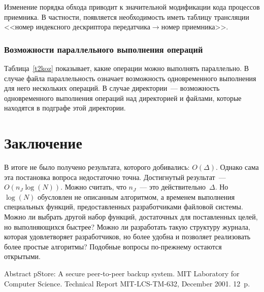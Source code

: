 \begin{multicols}{2}
      Изменение порядка обхода приводит к значительной модификации кода 
процессов приемника. В частности, появляется необходимость иметь таб\-ли\-цу 
трансляции <<номер индексного дескриптора передатчика\;$\rightarrow$\;номер 
приемника>>.

\vspace*{-6pt}

\subsubsection{Возможности параллельного выполнения операций} %

      Таблица~\ref{t2koz} показывает, какие операции можно выполнять 
параллельно. В случае файла параллельность означает возможность 
одновременного выполнения для него нескольких операций. В случае 
директории~--- возможность одновременного выполнения операций над 
директорией и файлами, которые находятся в подграфе этой директории. 
      

\vspace*{-6pt}
\section{Заключение}
\vspace*{1pt}

В итоге не было получено результата, которого добивались: $O(\Delta )$. 
Однако сама эта постановка вопроса недостаточно точна.   Достигнутый 
результат~--- $O(n_J \log(N))$.  Можно считать, что $n_J$~--- это действительно~$\Delta$. 
Но $\log (N)$ обусловлен не описанным алгоритмом, а временем выполнения 
специальных функций, предоставленных разработчиками файловой системы. 
Можно ли выбрать другой набор функций,  достаточных для поставленных 
целей, но выполняющихся быстрее? Можно ли разработать такую структуру 
журнала, которая удовлетворяет разработчиков, но более удобна и позволяет 
реализовать более простые алгоритмы? Подобные вопросы по-прежнему 
остаются открытыми.



{\small\frenchspacing
{ %
\begin{thebibliography}{99}    
\vspace*{-4pt}

Abstract pStore: A secure peer-to-peer backup system. MIT Laboratory for 
Computer Science. Technical Report MIT-LCS-TM-632, December 2001.  12~p.


\end{thebibliography}}}
\end{multicols}
